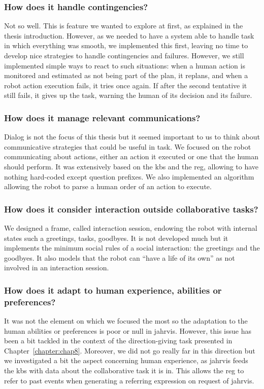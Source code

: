 \documentclass[a4paper,11pt,twoside]{StyleThese}
\begin{document}
\subsubsection*{How does it handle contingencies?} Not so well. This is feature we wanted to explore at first, as explained in the thesis introduction. However, as we needed to have a system able to handle task in which everything was smooth, we implemented this first, leaving no time to develop nice strategies to handle contingencies and failures. However, we still implemented simple ways to react to such situations: when a human action is monitored and estimated as not being part of the plan, it replans, and when a robot action execution fails, it tries once again. If after the second tentative it still fails, it gives up the task, warning the human of its decision and its failure.

\subsubsection*{How does it manage relevant communications?} Dialog is not the focus of this thesis but it seemed important to us to think about communicative strategies that could be useful in task. We focused on the robot communicating about actions, either an action it executed or one that the human should perform. It was extensively based on the \acrshort{kb}s and the \acrfull{reg}, allowing to have nothing hard-coded except question prefixes. We also implemented an algorithm allowing the robot to parse a human order of an action to execute.

\subsubsection*{How does it consider interaction outside collaborative tasks?} We designed a frame, called interaction session, endowing the robot with internal states such a greetings, tasks, goodbyes. It is not developed much but it implements the minimum social rules of a social interaction: the greetings and the goodbyes. It also models that the robot can ``have a life of its own'' as not involved in an interaction session.

\subsubsection*{How does it adapt to human experience, abilities or preferences?} It was not the element on which we focused the most so the adaptation to the human abilities or preferences is poor or null in \acrshort{jahrvis}. However, this issue has been a bit tackled in the context of the direction-giving task presented in Chapter~\ref{chapter:chap8}. Moreover, we did not go really far in this direction but we investigated a bit the aspect concerning human experience, as \acrshort{jahrvis} feeds the \acrshort{kb}s with data about the collaborative task it is in. This allows the \acrshort{reg} to refer to past events when generating a referring expression on request of \acrshort{jahrvis}.



\ifdefined{}
\else


\end{document}
